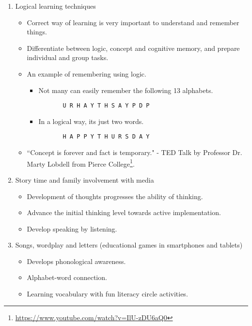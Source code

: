 \begin{enumerate}



\item Logical learning techniques
\begin{itemize}
\item Correct way of learning is very important to understand and remember things. 

\item Differentiate between logic, concept and cognitive memory, and prepare individual and group tasks. 

\item An example of remembering using logic. 

\begin{itemize}
\item Not many can easily remember the following 13 alphabets. 

\begin{lstlisting}
	   U R H A Y T H S A Y P D P
\end{lstlisting}

\item In a logical way, its just two words. 

\begin{lstlisting}
	   H A P P Y T H U R S D A Y  
\end{lstlisting}

\end{itemize}
	
   \item “Concept is forever and fact is temporary." -  TED Talk by Professor Dr. Marty Lobdell from Pierce College\footnote{\url{https://www.youtube.com/watch?v=IlU-zDU6aQ0}}.
\end{itemize}

\item Story time and family involvement with media
\begin{itemize}
\item Development of thoughts progresses the ability of thinking.
\item Advance the initial thinking level towards active implementation. 
\item Develop speaking by listening.

\end{itemize}

\item Songs, wordplay and letters (educational games in smartphones and tablets)
\begin{itemize}
\item Develops phonological awareness.
\item Alphabet-word connection.
\item Learning vocabulary with fun literacy circle activities.


\end{itemize}
\end{enumerate}

